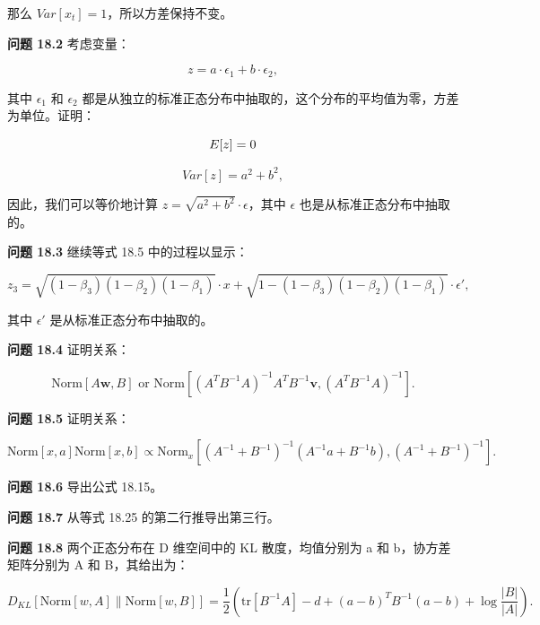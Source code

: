 \documentclass[lang=cn,newtx,10pt,scheme=chinese]{elegantbook}
\begin{document}
那么 \(Var[x_t] = 1\)，所以方差保持不变。

\textbf{问题 18.2} 考虑变量：

\begin{equation}
z = a \cdot \epsilon_1 + b \cdot \epsilon_2, 
\end{equation}

其中 \(\epsilon_1\) 和 \(\epsilon_2\) 都是从独立的标准正态分布中抽取的，这个分布的平均值为零，方差为单位。证明：

\begin{equation}
E[z] = 0 \notag
\end{equation}

\begin{equation}
Var[z] = a^2 + b^2, 
\end{equation}

因此，我们可以等价地计算 \(z = \sqrt{a^2 + b^2} \cdot \epsilon\)，其中 \(\epsilon\) 也是从标准正态分布中抽取的。

\textbf{问题 18.3} 继续等式 18.5 中的过程以显示：

\begin{equation}
z_3 = \sqrt{(1 - \beta_3)(1 - \beta_2)(1 - \beta_1)} \cdot x + \sqrt{1 - (1 - \beta_3)(1 - \beta_2)(1 - \beta_1)} \cdot \epsilon', 
\end{equation}

其中 \(\epsilon'\) 是从标准正态分布中抽取的。

\textbf{问题 18.4} 证明关系：

\begin{equation}
\text{Norm}[A\mathbf{w}, B] \text{ or Norm} \left[ (A^T B^{-1} A)^{-1} A^T B^{-1}\mathbf{v}, (A^T B^{-1} A)^{-1} \right]. 
\end{equation}

\textbf{问题 18.5} 证明关系：

\begin{equation}
\text{Norm}[x, a] \text{Norm}[x, b] \propto \text{Norm}_x \left[ (A^{-1} + B^{-1})^{-1}(A^{-1}a + B^{-1}b), (A^{-1} + B^{-1})^{-1} \right]. 
\end{equation}

\textbf{问题 18.6} 导出公式 18.15。

\textbf{问题 18.7} 从等式 18.25 的第二行推导出第三行。

\textbf{问题 18.8} 两个正态分布在 D 维空间中的 KL 散度，均值分别为 a 和 b，协方差矩阵分别为 A 和 B，其给出为：

\begin{equation}
D_{KL} [\text{Norm}[w, A] \| \text{Norm}[w, B]] = \frac{1}{2} \left( \text{tr}[B^{-1}A] - d + (a - b)^T B^{-1}(a - b) + \log \frac{|B|}{|A|} \right). 
\end{equation}
\end{document}
